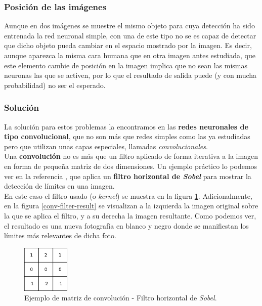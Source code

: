 \documentclass[]{scrartcl}
\begin{document}
		\subsubsection*{Posición de las imágenes}
		
			Aunque en dos imágenes se muestre el mismo objeto para cuya detección ha sido entrenada la red neuronal simple, con una de este tipo no se es capaz de detectar que dicho objeto pueda cambiar en el espacio mostrado por la imagen. Es decir, aunque aparezca la misma cara humana que en otra imagen antes estudiada, que este elemento cambie de posición en la imagen implica que no sean las mismas neuronas las que se activen, por lo que el resultado de salida puede (y con mucha probabilidad) no ser el esperado.
			
		\subsubsection*{Solución}
		
			La solución para estos problemas la encontramos en las \textbf{redes neuronales de tipo convolucional}, que no son más que redes simples como las ya estudiadas pero que utilizan unas capas especiales, llamadas \textit{convolucionales}.\\
			
			Una \textbf{convolución} no es más que un filtro aplicado de forma iterativa a la imagen en forma de pequeña matriz de dos dimensiones. Un ejemplo práctico lo podemos ver en la referencia \cite{intro-convolutional-nn}, que aplica un \textbf{filtro horizontal de \textit{Sobel}} para mostrar la detección de límites en una imagen.\\
			
			En este caso el filtro usado (o \textit{kernel}) se muestra en la figura \ref{conv-filter}. Adicionalmente, en la figura \ref{conv-filter-result} se visualizan a la izquierda la imagen original sobre la que se aplica el filtro, y a su derecha la imagen resultante. Como podemos ver, el resultado es una nueva fotografía en blanco y negro donde se manifiestan los límites más relevantes de dicha foto.\\
			
			\begin{figure}[h]
				\centering
				\includegraphics[width=0.2\textwidth]{./img/horizontal-sobel}
				\caption{Ejemplo de matriz de convolución - Filtro horizontal de \textit{Sobel}.}
				\label{conv-filter}
			\end{figure}
		
\end{document}
